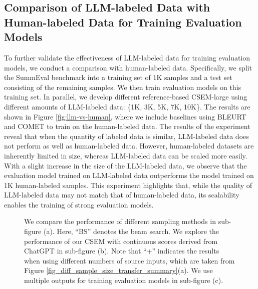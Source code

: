 \documentclass[lettersize,journal]{IEEEtran}
\begin{document}
\subsection{Comparison of LLM-labeled Data with Human-labeled Data for Training Evaluation Models}
To further validate the effectiveness of LLM-labeled data for training evaluation models, we conduct a comparison with human-labeled data. Specifically, we split the SummEval benchmark into a training set of 1K samples and a test set consisting of the remaining samples. We then train evaluation models on this training set. In parallel, we develop different reference-based CSEM-large using different amounts of LLM-labeled data: \{1K, 3K, 5K, 7K, 10K\}. The results are shown in Figure \ref{fig:llm-vs-human}, where we include baselines using BLEURT and COMET to train on the human-labeled data. The results of the experiment reveal that when the quantity of labeled data is similar, LLM-labeled data does not perform as well as human-labeled data. However, human-labeled datasets are inherently limited in size, whereas LLM-labeled data can be scaled more easily. With a slight increase in the size of the LLM-labeled data, we observe that the evaluation model trained on LLM-labeled data outperforms the model trained on 1K human-labeled samples. This experiment highlights that, while the quality of LLM-labeled data may not match that of human-labeled data, its scalability enables the training of strong evaluation models.

\begin{figure}
    \centering
    
    \vspace{-4mm}
    \caption{
    We compare the performance of different sampling methods in sub-figure (a). Here, ``BS'' denotes the beam search. We explore the performance of our CSEM with continuous scores derived from ChatGPT in sub-figure (b). Note that ``+'' indicates the results when using different numbers of source inputs, which are taken from Figure \ref{fig_diff_sample_size_transfer_summary}(a). We use multiple outputs for training evaluation models in sub-figure (c). 
    }
    \vspace{-2mm}
    \label{fig:analysis-sampling-output-continous-score}
\end{figure}
\end{document}
